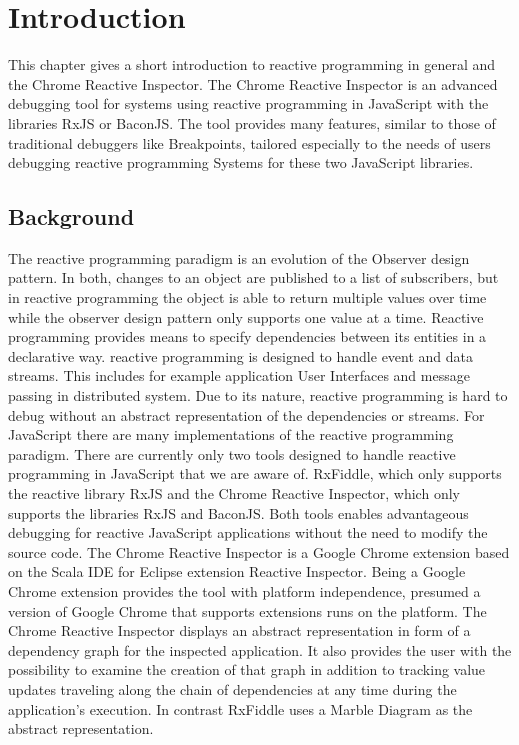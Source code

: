 \chapter{Introduction} \label{ch:Introduction}
This chapter gives a short introduction to reactive programming in general and the Chrome Reactive Inspector. The Chrome Reactive Inspector is an advanced debugging tool for systems using reactive programming in JavaScript with the libraries RxJS or BaconJS. The tool provides many features, similar to those of traditional debuggers like Breakpoints, tailored especially to the needs of users debugging reactive programming Systems for these two JavaScript libraries.

\section{Background}
The reactive programming paradigm is an evolution of the Observer design pattern. In both, changes to an object are published to a list of subscribers, but in reactive programming the object is able to return multiple values over time while the observer design pattern only supports one value at a time. Reactive programming provides means to specify dependencies between its entities in a declarative way. reactive programming is designed to handle event and data streams. This includes for example application User Interfaces and message passing in distributed system. Due to its nature, reactive programming is hard to debug without an abstract representation of the dependencies or streams.
For JavaScript there are many implementations of the reactive programming paradigm. There are currently only two tools designed to handle reactive programming in JavaScript that we are aware of. RxFiddle, which only supports the reactive library RxJS and the Chrome Reactive Inspector, which only supports the libraries RxJS and BaconJS. Both tools enables advantageous debugging for reactive JavaScript applications without the need to modify the source code. The Chrome Reactive Inspector is a Google Chrome extension based on the Scala IDE for Eclipse extension Reactive Inspector. Being a Google Chrome extension provides the tool with platform independence, presumed a version of Google Chrome that supports extensions runs on the platform.
The Chrome Reactive Inspector displays an abstract representation in form of a dependency graph for the inspected application. It also provides the user with the possibility to examine the creation of that graph in addition to tracking value updates traveling along the chain of dependencies at any time during the application's execution.%
In contrast RxFiddle uses a Marble Diagram as the abstract representation.


